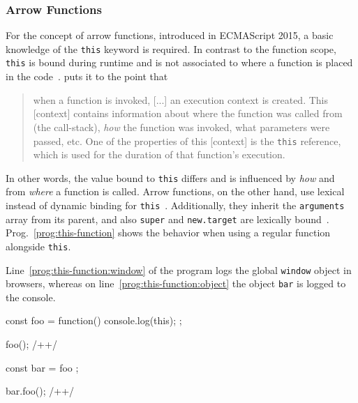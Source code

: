 \subsubsection{Arrow Functions}

For the concept of arrow functions, introduced in ECMAScript 2015, a basic knowledge of the \texttt{this} keyword is required. In contrast to the function scope, \texttt{this} is bound during runtime and is not associated to where a function is placed in the code~\cite[p.~9]{YDKJS:ThisAndObjectPrototypes:Simpson:2015}. \citeauthor{YDKJS:ThisAndObjectPrototypes:Simpson:2015} puts it to the point that
\begin{quote}
  when a function is invoked, [...] an execution context is created. This [context] contains information about where the function was called from (the call-stack), \emph{how} the function was invoked, what parameters were passed, etc. One of the properties of this [context] is the \texttt{this} reference, which is used for the duration of that function’s execution.~\cite[p.~1]{YDKJS:ThisAndObjectPrototypes:Simpson:2015}
\end{quote}
In other words, the value bound to \texttt{this} differs and is influenced by \emph{how} and from \emph{where} a function is called. Arrow functions, on the other hand, use lexical instead of dynamic binding for \texttt{this}~\cite[p.~58]{YDKJS:ES6AndBeyond:Simpson:2015}. Additionally, they inherit the \texttt{arguments} array from its parent, and also \texttt{super} and \texttt{new.target} are lexically bound~\cite[p.~59]{YDKJS:ES6AndBeyond:Simpson:2015}. Prog.~\ref{prog:this-function} shows the behavior when using a regular function alongside \texttt{this}.
\begin{program}
\caption{Line~\ref{prog:this-function:window} of the program logs the global \texttt{window} object in browsers, whereas on line~\ref{prog:this-function:object} the object \texttt{bar} is logged to the console.~\cite[p.~18]{TypeScriptBook:Syed:2017}}
\label{prog:this-function}
\begin{JsCode}
const foo = function() {
  console.log(this);
};

foo(); /+\label{prog:this-function:window}+/

const bar = { foo };

bar.foo(); /+\label{prog:this-function:object}+/
\end{JsCode}
\end{program}

